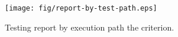 \begin{figure}[!ht]
\begin{center}
\texttt{[image: fig/report-by-test-path.eps]}
\caption{\label{fig:report-by-test-path} Testing report by
execution path \wrt the  criterion.}
\end{center}
\end{figure}
